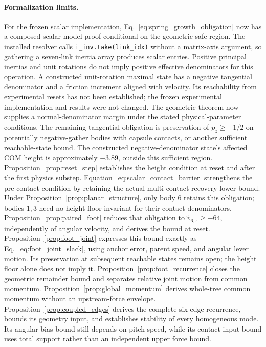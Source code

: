 \paragraph{Formalization limits.}
For the frozen scalar implementation, Eq.~\eqref{eq:spring_growth_obligation} now has a composed scalar-model proof conditional on the geometric safe region.
The installed resolver calls \texttt{i\_inv.take(link\_idx)} without a matrix-axis argument, so gathering a seven-link inertia array produces scalar entries.
Positive principal inertias and unit rotations do not imply positive effective denominators for this operation.
A constructed unit-rotation maximal state has a negative tangential denominator and a friction increment aligned with velocity.
Its reachability from experimental resets has not been established; the frozen experimental implementation and results were not changed.
The geometric theorem now supplies a normal-denominator margin under the stated physical-parameter conditions.
The remaining tangential obligation is preservation of $p_z\ge-1/2$ on potentially negative-gather bodies with capsule contacts, or another sufficient reachable-state bound.
The constructed negative-denominator state's affected COM height is approximately $-3.89$, outside this sufficient region.
Proposition~\ref{prop:reset_step} establishes the height condition at reset and after the first physics substep.
Equation~\eqref{eq:scalar_contact_barrier} strengthens the pre-contact condition by retaining the actual multi-contact recovery lower bound.
Under Proposition~\ref{prop:planar_structure}, only body $6$ retains this obligation; bodies $1,3$ need no height-floor invariant for their contact denominators.
Proposition~\ref{prop:paired_foot} reduces that obligation to $\widetilde v_{6,z}\ge-64$, independently of angular velocity, and derives the bound at reset.
Proposition~\ref{prop:foot_joint} expresses this bound exactly as Eq.~\eqref{eq:foot_joint_slack}, using anchor error, parent speed, and angular lever motion.
Its preservation at subsequent reachable states remains open; the height floor alone does not imply it.
Proposition~\ref{prop:foot_recurrence} closes the geometric remainder bound and separates relative joint motion from common momentum.
Proposition~\ref{prop:global_momentum} derives whole-tree common momentum without an upstream-force envelope.
Proposition~\ref{prop:coupled_edges} derives the complete six-edge recurrence, bounds its geometry input, and establishes stability of every homogeneous mode.
Its angular-bias bound still depends on pitch speed, while its contact-input bound uses total support rather than an independent upper force bound.

